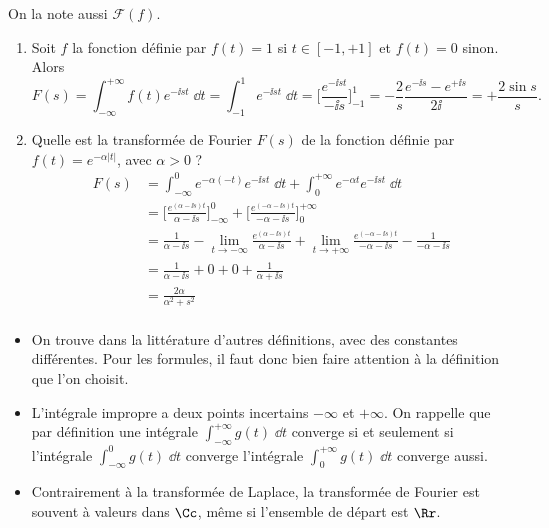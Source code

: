 \documentclass[class=report,crop=false]{standalone}
\begin{document}
On la note aussi $\mathcal{F}(f)$.




\begin{exemple}
\label{ex:fourier1}
\begin{enumerate}
  \item Soit $f$ la fonction définie par $f(t) = 1$ si $t\in[-1,+1]$ et $f(t)=0$ sinon.
  Alors
  $$F(s) = \int_{-\infty}^{+\infty} f(t) e^{-\ii st}\;\dd t
  = \int_{-1}^{1} e^{-\ii st}\;\dd t
  = \Big[\frac{e^{-\ii st}}{-\ii s}\Big]_{-1}^{1}
  = -\frac{2}{s}\frac{e^{-\ii s} - e^{+\ii s}}{2\ii}
  = +\frac{2\sin s}{s}.$$
  
  
  \item Quelle est la transformée de Fourier $F(s)$ de la fonction définie par
$f(t) = e^{-\alpha |t|}$, avec $\alpha>0$ ? 
\begin{align*}
F(s) & = \int_{-\infty}^0 e^{-\alpha (-t)}e^{-\ii st}\;\dd t
+\int_0^{+\infty} e^{-\alpha t}e^{-\ii st}\;\dd t \\
& = \Big[ \frac{e^{(\alpha -\ii s)t}}{\alpha -\ii s} \Big]_{-\infty}^0 
+ \Big[ \frac{e^{(-\alpha -\ii s)t}}{-\alpha -\ii s} \Big]_0^{+\infty}\\
& = \frac{1}{\alpha -\ii s}
- \lim_{t\to-\infty} \frac{e^{(\alpha -\ii s)t}}{\alpha -\ii s}
+ \lim_{t\to+\infty}\frac{e^{(-\alpha -\ii s)t}}{-\alpha -\ii s}
- \frac{1}{-\alpha -\ii s} \\
& = \frac{1}{\alpha -\ii s} + 0+ 0 + \frac{1}{\alpha +\ii s}\\
& = \frac{2\alpha}{\alpha^2+s^2} \\
\end{align*}


\end{enumerate}


\end{exemple}



\begin{remarque*}
\begin{itemize}
  \item On trouve dans la littérature d'autres définitions, 
  avec des constantes différentes. Pour les formules, il faut 
  donc bien faire attention à la définition que l'on choisit.
  
  \item L'intégrale impropre a deux points incertains $-\infty$ et $+\infty$.
  On rappelle que par définition une intégrale
  $\int_{-\infty}^{+\infty} g(t)\;\dd t$ converge si et seulement si
  l'intégrale $\int_{-\infty}^0 g(t)\;\dd t$ converge  l'intégrale
  $\int_0^{+\infty} g(t)\;\dd t$ converge aussi.
  
  \item Contrairement à la transformée de Laplace, la transformée de Fourier 
  est souvent à valeurs dans $\Cc$, même si l'ensemble de départ est $\Rr$.
  
\end{itemize}
\end{remarque*}
\end{document}

